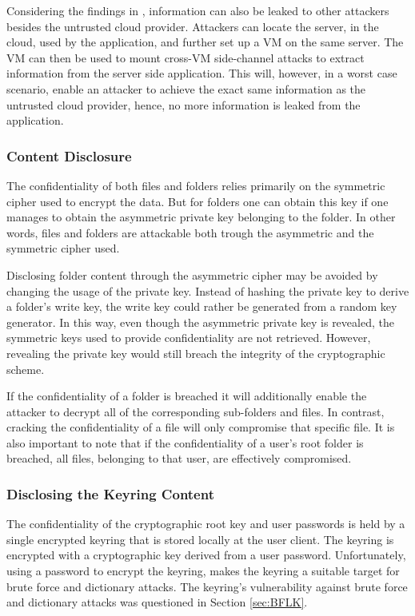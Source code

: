\documentclass[pdftex,english,10pt,b5paper,twoside]{book}
\begin{document}
Considering the findings in \cite{cloud_getoff}, information can also be leaked
to other attackers besides the untrusted cloud provider. Attackers can locate
the server, in the cloud, used by the application, and further set up a \ac{VM} on the same
server. The \ac{VM} can then be used to mount cross-\ac{VM} side-channel attacks
to extract information from the server side application. This will, however, in
a worst case scenario, enable an attacker to achieve the exact same information
as the untrusted cloud provider, hence, no more information is leaked from the
application.

\subsubsection{Content Disclosure}
The confidentiality of both files and folders relies primarily on the symmetric
cipher used to encrypt the data. But for folders one can obtain this key if one
manages to obtain the asymmetric private key belonging to the folder. In other
words, files and folders are attackable both trough the asymmetric and the
symmetric cipher used.

Disclosing folder content through the asymmetric cipher may be avoided by changing the
usage of the private key. Instead of hashing the private key to derive a folder's
write key, the write key could rather be generated from a random key generator.
In this way, even though the asymmetric private key is revealed, the symmetric
keys used to provide confidentiality are not retrieved. However, revealing the
private key would still breach the integrity of the cryptographic scheme.

If the confidentiality of a folder is breached it will additionally enable the
attacker to decrypt all of the corresponding sub-folders and files. In contrast,
cracking the confidentiality of a file will only compromise that specific file. It is
also important to note that if the confidentiality of a user's root folder is breached,
all files, belonging to that user, are effectively compromised.

\subsubsection{Disclosing the Keyring Content}
The confidentiality of the cryptographic root key and user passwords is held by
a single encrypted keyring that is stored locally at the user client. The
keyring is encrypted with a cryptographic key derived from a user password.
Unfortunately, using a password to encrypt the keyring, makes the keyring a
suitable target for brute force and dictionary attacks. The keyring's
vulnerability against brute force and dictionary attacks was questioned in
Section \ref{sec:BFLK}.
\end{document}
